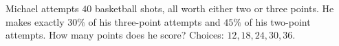 Michael attempts $40$ basketball shots, all worth either two or three points. He makes exactly $30\%$ of his three-point attempts and $45\%$ of his two-point attempts. How many points does he score? Choices: $12,18,24,30,36$.
